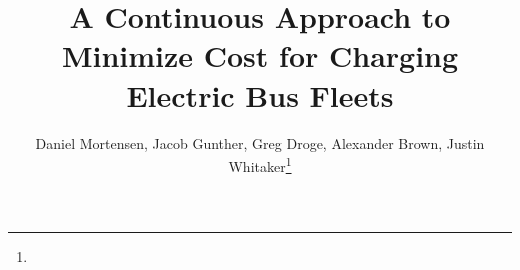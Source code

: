 \documentclass[lettersize,journal]{IEEEtran}
\begin{document}
\title{A Continuous Approach to Minimize Cost for Charging Electric Bus Fleets}
\author{Daniel Mortensen, Jacob Gunther, Greg Droge, Alexander Brown, Justin Whitaker\thanks{}}

%
{}

\maketitle 








\printbibliography
\end{document}

